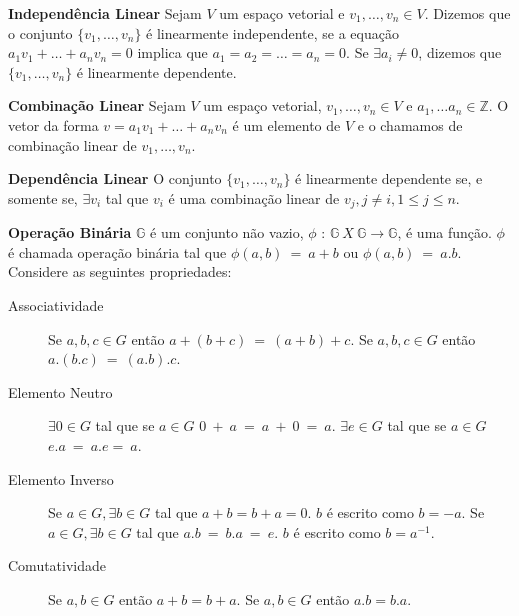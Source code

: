 \begin{definition} {\bf Independência Linear} \label{IndepLin}  Sejam $V$ um espaço vetorial e $v_1, \ldots, v_n \in V$. Dizemos que o conjunto $\{ v_1, \ldots, v_n\}$ é linearmente independente, se a equação $a_1v_1 + \ldots + a_nv_n=0$ implica que $a_1=a_2= \ldots =a_n=0$. Se $\exists a_i \neq 0$, dizemos que $\{ v_1, \ldots, v_n\}$ é linearmente dependente.
\end{definition}


\begin{definition} {\bf Combinação Linear} \label{CombLin}   Sejam $V$ um espaço vetorial, $v_1, \ldots, v_n \in V$ e $a_1, \ldots a_n \in \mathbb{Z}$. O vetor da forma $v=a_1v_1 + \ldots + a_nv_n$ é um elemento de $V$ e o chamamos de combinação linear de $v_1, \ldots, v_n$.
\end{definition}

\begin{theorem} {\bf Dependência Linear} \label{DepLin}   O conjunto $\{ v_1, \ldots, v_n\}$ é linearmente dependente se, e somente se, $\exists v_i$ tal que $v_i$ é uma combinação linear de $v_j, j \neq i, 1 \leq j \leq n$.
\end{theorem}

\begin{definition} {\bf Operação Binária} \label{OperBin}  $\mathbb{G}$ é um conjunto não vazio, $\phi$ : $\mathbb{G}\ X\ \mathbb{G} \rightarrow \mathbb{G}$, é uma função. $\phi$ é chamada operação binária tal que  $\phi(a,b)\ =\ a+b $ ou $\phi(a,b)\ =\ a.b$. Considere as seguintes propriedades:
  \begin{description}
     \item [Associatividade] Se $a, b, c \in G$ então $a+(b+c)\ =\ (a+b)+c$. Se $a, b, c \in G$ então $a.(b.c)\ =\ (a.b).c$. 
     \item [Elemento Neutro] $\exists 0 \in G$ tal que se $a \in G$ $0\ +\ a\ =\ a\ +\ 0\ =\ a$. $\exists e \in G$ tal que se $a \in G$ $e.a\ =\ a.e =\ a$.
     \item [Elemento Inverso]  Se $a \in G, \exists b \in G$ tal que $a + b = b + a = 0$. $b$ é escrito como $b = -a$. Se $a \in G, \exists b \in G$ tal que $a.b\ =\ b.a\ =\ e$. $b$ é escrito como $b = a^{-1}$.
     \item [Comutatividade] Se $a, b \in G$ então $a + b = b + a$. Se $a, b \in G$ então $a . b = b . a$.
  \end{description}
\end{definition}


